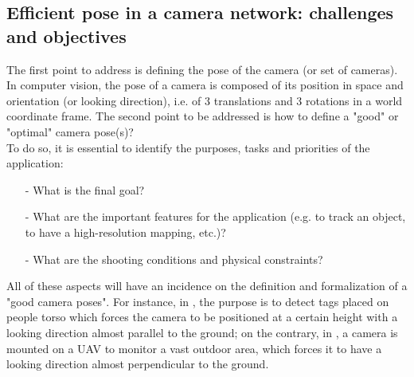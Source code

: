 \subsection{Efficient pose in a camera network: challenges and objectives}
The first point to address is defining the pose of the camera (or set of cameras). In computer vision, the pose of a camera is composed of its position in space and orientation (or looking direction), i.e. of 3 translations and 3 rotations in a world coordinate frame. The second point to be addressed is how to define a "good" or "optimal" camera pose(s)?\\
 To do so, it is essential to identify the purposes, tasks and priorities of the application: 
 \begin{itemize}
 \item [-] What is the final goal?
 \item [-] What are the important features for the application (e.g. to track an object, to have a high-resolution mapping, etc.)?
 \item [-] What are the shooting conditions and physical constraints?
 \end{itemize}
   All of these aspects will have an incidence on the definition and formalization of a "good camera poses". For instance, in \cite{22*zhao2008}, the purpose is to detect tags placed on people torso which forces the camera to be positioned at a certain height with a looking direction almost parallel to the ground; on the contrary, in \cite{146*li2011}, a camera is mounted on a UAV to monitor a vast outdoor area, which forces it to have a looking direction almost perpendicular to the ground. 



